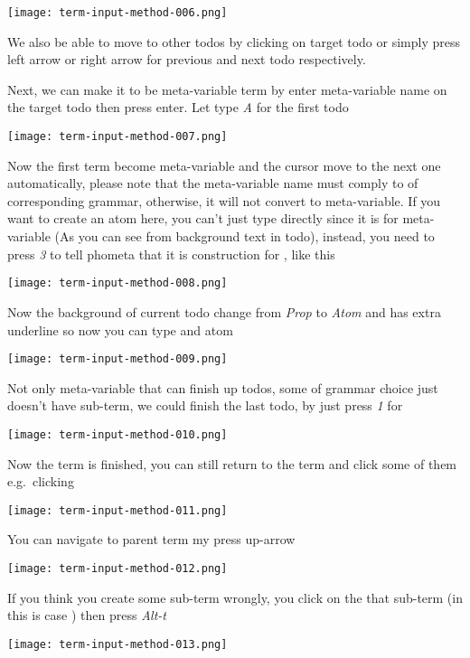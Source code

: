 \documentclass[master.tex]{subfiles}
\begin{document}
\centerline{\texttt{[image: term-input-method-006.png]}}

We also be able to move to other todos by clicking on target todo or simply
press left arrow or right arrow for previous and next todo respectively.

Next, we can make it to be meta-variable term by enter meta-variable name on the
target todo then press enter. Let type \emph{A} for the first todo

\centerline{\texttt{[image: term-input-method-007.png]}}

Now the first term become meta-variable and the cursor move to the next one
automatically, please note that the meta-variable name must comply to \kVarRegex
of corresponding grammar, otherwise, it will not convert to meta-variable. If
you want to create an atom here, you can't just type directly since it is for
 meta-variable (As you can see from background text in todo),
instead, you need to press \emph{3} to tell phometa that it is construction for
, like this

\centerline{\texttt{[image: term-input-method-008.png]}}

Now the background of current todo change from \emph{Prop} to \emph{Atom} and
has extra underline so now you can type and atom

\centerline{\texttt{[image: term-input-method-009.png]}}

Not only meta-variable that can finish up todos, some of grammar choice just
doesn't have sub-term, we could finish the last todo, by just press \emph{1} for \propTop

\centerline{\texttt{[image: term-input-method-010.png]}}

Now the term is finished, you can still return to the term and click some of
them e.g.\ clicking 

\centerline{\texttt{[image: term-input-method-011.png]}}

You can navigate to parent term my press up-arrow

\centerline{\texttt{[image: term-input-method-012.png]}}

If you think you create some sub-term wrongly, you click on the that sub-term
(in this is case ) then press \emph{Alt-t}

\centerline{\texttt{[image: term-input-method-013.png]}}
\end{document}
